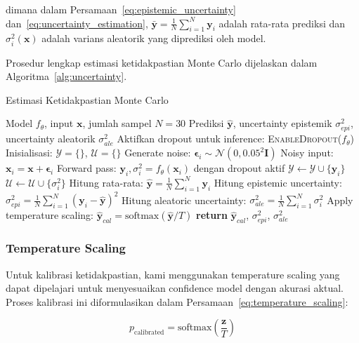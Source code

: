 dimana dalam Persamaan~\ref{eq:epistemic_uncertainty} dan~\ref{eq:uncertainty_estimation}, $\bar{\mathbf{y}} = \frac{1}{N} \sum_{i=1}^N \mathbf{y}_i$ adalah rata-rata prediksi dan $\sigma_i^2(\mathbf{x})$ adalah varians aleatorik yang diprediksi oleh model.

Prosedur lengkap estimasi ketidakpastian Monte Carlo dijelaskan dalam Algoritma~\ref{alg:uncertainty}.

\begin{algorithm}[htbp]
\caption{Estimasi Ketidakpastian Monte Carlo}
\label{alg:uncertainty}
\begin{algorithmic}[1]
\Require Model $f_\theta$, input $\mathbf{x}$, jumlah sampel $N = 30$
\Ensure Prediksi $\hat{\mathbf{y}}$, uncertainty epistemik $\sigma_{epi}^2$, uncertainty aleatorik $\sigma_{ale}^2$
\State Aktifkan dropout untuk inference: \textsc{EnableDropout}($f_\theta$)
\State Inisialisasi: $\mathcal{Y} = \{\}$, $\mathcal{U} = \{\}$
    \State Generate noise: $\boldsymbol{\epsilon}_i \sim \mathcal{N}(0, 0.05^2 \mathbf{I})$
    \State Noisy input: $\mathbf{x}_i = \mathbf{x} + \boldsymbol{\epsilon}_i$
    \State Forward pass: $\mathbf{y}_i, \sigma_i^2 = f_\theta(\mathbf{x}_i)$ dengan dropout aktif
    \State $\mathcal{Y} \leftarrow \mathcal{Y} \cup \{\mathbf{y}_i\}$
    \State $\mathcal{U} \leftarrow \mathcal{U} \cup \{\sigma_i^2\}$
\EndFor
\State Hitung rata-rata: $\hat{\mathbf{y}} = \frac{1}{N} \sum_{i=1}^N \mathbf{y}_i$
\State Hitung epistemic uncertainty: $\sigma_{epi}^2 = \frac{1}{N} \sum_{i=1}^N (\mathbf{y}_i - \hat{\mathbf{y}})^2$
\State Hitung aleatoric uncertainty: $\sigma_{ale}^2 = \frac{1}{N} \sum_{i=1}^N \sigma_i^2$
\State Apply temperature scaling: $\hat{\mathbf{y}}_{cal} = \text{softmax}(\hat{\mathbf{y}}/T)$
\State \textbf{return} $\hat{\mathbf{y}}_{cal}$, $\sigma_{epi}^2$, $\sigma_{ale}^2$
\end{algorithmic}
\end{algorithm}

\subsubsection{Temperature Scaling}
Untuk kalibrasi ketidakpastian, kami menggunakan temperature scaling yang dapat dipelajari untuk menyesuaikan confidence model dengan akurasi aktual. Proses kalibrasi ini diformulasikan dalam Persamaan~\ref{eq:temperature_scaling}:

\begin{equation}
p_{\text{calibrated}} = \text{softmax}\left(\frac{\mathbf{z}}{T}\right)
\label{eq:temperature_scaling}
\end{equation}

